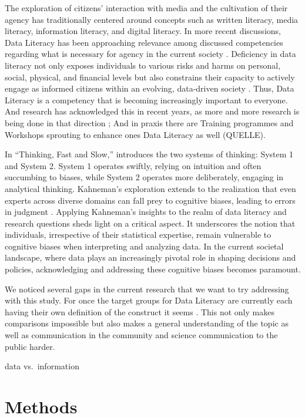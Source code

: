 \documentclass[
  12pt,
  a4paper,
  twoside]{article}
\begin{document}
The exploration of citizens' interaction with media and the cultivation of their agency has traditionally centered around concepts such as written literacy, media literacy, information literacy, and digital literacy. In more recent discussions, Data Literacy has been approaching relevance among discussed competencies regarding what is necessary for agency in the current society \parencite{carmi2020}. Deficiency in data literacy not only exposes individuals to various risks and harms on personal, social, physical, and financial levels but also constrains their capacity to actively engage as informed citizens within an evolving, data-driven society \parencite{carmi2020}. Thus, Data Literacy is a competency that is becoming increasingly important to everyone. And research has acknowledged this in recent years, as more and more research is being done in that direction \parencite{Cui2023}; And in praxis there are Training programmes and Workshops sprouting to enhance ones Data Literacy as well (QUELLE).

In ``Thinking, Fast and Slow,'' \cite{kahneman2011} introduces the two systems of thinking: System 1 and System 2. System 1 operates swiftly, relying on intuition and often succumbing to biases, while System 2 operates more deliberately, engaging in analytical thinking. Kahneman's exploration extends to the realization that even experts across diverse domains can fall prey to cognitive biases, leading to errors in judgment \parencite{kahneman2011}.
Applying Kahneman's insights to the realm of data literacy and research questions sheds light on a critical aspect. It underscores the notion that individuals, irrespective of their statistical expertise, remain vulnerable to cognitive biases when interpreting and analyzing data. In the current societal landscape, where data plays an increasingly pivotal role in shaping decisions and policies, acknowledging and addressing these cognitive biases becomes paramount.

We noticed several gaps in the current research that we want to try addressing with this study. For once the target groups for Data Literacy are currently each having their own definition of the construct it seems \parencite{Cui2023}. This not only makes comparisons impossible but also makes a general understanding of the topic as well as communication in the community and science communication to the public harder.

data vs.~information

\hypertarget{methods-2}{%
\section{Methods}\label{methods-2}}
\end{document}
